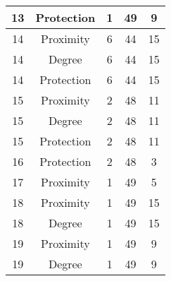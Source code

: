 \documentclass[results.tex]{subfiles}
\begin{document}
\begin{center}
\begin{tabular}{| c || c | c | c | c |}
            \hline
            13                      & Protection                   & 1                      & 49                      & 9                    \\
            \hline
            14                      & Proximity                    & 6                      & 44                      & 15                   \\
            \hline
            14                      & Degree                       & 6                      & 44                      & 15                   \\
            \hline
            14                      & Protection                   & 6                      & 44                      & 15                   \\
            \hline
            15                      & Proximity                    & 2                      & 48                      & 11                   \\
            \hline
            15                      & Degree                       & 2                      & 48                      & 11                   \\
            \hline
            15                      & Protection                   & 2                      & 48                      & 11                   \\
            \hline
            16                      & Protection                   & 2                      & 48                      & 3                    \\
            \hline
            17                      & Proximity                    & 1                      & 49                      & 5                    \\
            \hline
            18                      & Proximity                    & 1                      & 49                      & 15                   \\
            \hline
            18                      & Degree                       & 1                      & 49                      & 15                   \\
            \hline
            19                      & Proximity                    & 1                      & 49                      & 9                    \\
            \hline
            19                      & Degree                       & 1                      & 49                      & 9                    \\

\end{tabular}
\end{center}
\end{document}
